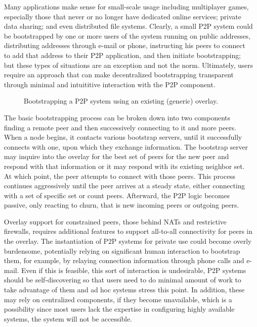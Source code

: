 \documentclass[conference]{IEEEtran}
\begin{document}
Many applications make sense for small-scale usage including multiplayer games,
especially those that never or no longer have dedicated online services;
private data sharing; and even distributed file systems.  Clearly, a small P2P
system could be bootstrapped by one or more users of the system running on
public addresses, distributing addresses through e-mail or phone, instructing
his peers to connect to add that address to their P2P application, and then
initiate bootstrapping; but these types of situations are an exception and not
the norm.  Ultimately, users require an approach that can make decentralized
bootstrapping transparent through minimal and intuititive interaction with the
P2P component.

\begin{figure*}[h!t!]
\centering
{}
\caption{Bootstrapping a P2P system using an existing (generic) overlay.}
\label{fig:bootstrap}
\end{figure*}

The basic bootstrapping process can be broken down into two components finding
a remote peer and then successively connecting to it and more peers.  When a
node begins, it contacts various bootstrap servers, until it successfully
connects with one, upon which they exchange information.  The bootstrap server
may inquire into the overlay for the best set of peers for the new peer and
respond with that information or it may respond with its existing neighbor set.
At which point, the peer attempts to connect with those peers.  This process
continues aggressively until the peer arrives at a steady state, either
connecting with a set of specific set or count peers.  Afterward, the P2P logic
becomes passive, only reacting to churn, that is new incoming peers or outgoing
peers.

Overlay support for constrained peers, those behind NATs and restrictive
firewalls, requires additional features to support all-to-all connectivity for
peers in the overlay.  The instantiation of P2P systems for private use could
become overly burdensome, potentially relying on significant human interaction
to bootstrap them, for example, by relaying connection information through
phone calls and e-mail.  Even if this is feasible, this sort of interaction is
undesirable, P2P systems should be self-discovering so that users need to do
minimal amount of work to take advantage of them and ad hoc systems stress this
point.  In addition, these may rely on centralized components, if they become
unavailable, which is a possibility since most users lack the expertise in
configuring highly available systems, the system will not be accessible.
\end{document}
